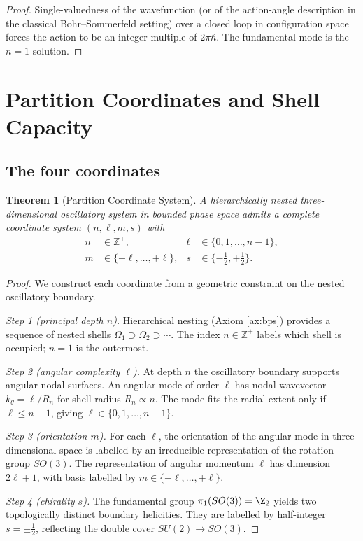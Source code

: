 \documentclass[twocolumn,10pt,a4paper]{article}
\theoremstyle{thmstyle}
\newtheorem{theorem}{Theorem}[section]
\theoremstyle{definition}
\theoremstyle{remark}
\newcommand{\Zp}{\mathbb{Z}^{+}}
\begin{document}
\begin{proof}
Single-valuedness of the wavefunction (or of the action-angle
description in the classical Bohr--Sommerfeld setting) over a closed
loop in configuration space forces the action to be an integer
multiple of $2\pi\hbar$. The fundamental mode is the $n=1$ solution.
\end{proof}

\section{Partition Coordinates and Shell Capacity}
\label{sec:partition}

\subsection{The four coordinates}

\begin{theorem}[Partition Coordinate System]
\label{thm:nlms}
A hierarchically nested three-dimensional oscillatory system in
bounded phase space admits a complete coordinate system
$(n,\ell,m,s)$ with
\begin{align*}
n&\in\Zp,&\ell&\in\{0,1,\ldots,n-1\},\\
m&\in\{-\ell,\ldots,+\ell\},& s&\in\{-\tfrac{1}{2},+\tfrac{1}{2}\}.
\end{align*}
\end{theorem}

\begin{proof}
We construct each coordinate from a geometric constraint on the
nested oscillatory boundary.

\emph{Step 1 (principal depth $n$).} Hierarchical nesting (Axiom
\ref{ax:bps}) provides a sequence of nested shells
$\Omega_{1}\supset\Omega_{2}\supset\cdots$. The index $n\in\Zp$
labels which shell is occupied; $n=1$ is the outermost.

\emph{Step 2 (angular complexity $\ell$).} At depth $n$ the
oscillatory boundary supports angular nodal surfaces. An angular mode
of order $\ell$ has nodal wavevector $k_{\theta}=\ell/R_{n}$ for shell
radius $R_{n}\propto n$. The mode fits the radial extent only if
$\ell\leq n-1$, giving $\ell\in\{0,1,\ldots,n-1\}$.

\emph{Step 3 (orientation $m$).} For each $\ell$, the orientation of
the angular mode in three-dimensional space is labelled by an
irreducible representation of the rotation group $SO(3)$. The
representation of angular momentum $\ell$ has dimension $2\ell+1$, with
basis labelled by $m\in\{-\ell,\ldots,+\ell\}$.

\emph{Step 4 (chirality $s$).} The fundamental group
$\pi_{1}(SO(3))=\Z_{2}$ \citep{nakahara2003} yields two topologically
distinct boundary helicities. They are labelled by half-integer
$s=\pm\tfrac{1}{2}$, reflecting the double cover $SU(2)\to SO(3)$.
\end{proof}
\end{document}
